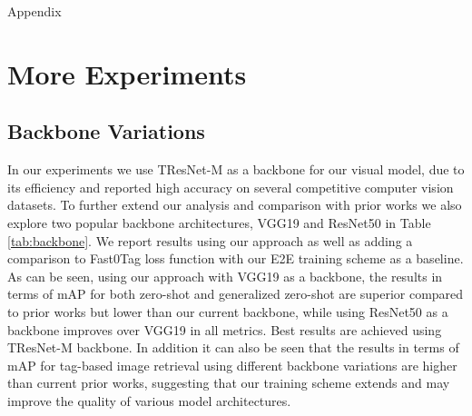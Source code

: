 
\begin{center} \begin{Large}{Appendix} \end{Large} \end{center}
\label{appendix}

\section{More Experiments}
\label{sec:more_experiments}
\subsection{Backbone Variations}

In our experiments we use TResNet-M \cite{ridnik2021tresnet} as a backbone for our visual model, due to its efficiency and reported high accuracy on several competitive computer vision datasets. To further extend our analysis and comparison with prior works we also explore two popular backbone architectures, VGG19 \cite{simonyan2014very} and ResNet50 \cite{he2016deep} in Table \ref{tab:backbone}. We report results using our approach as well as adding a comparison to Fast0Tag \cite{zhang2016fast} loss function with our E2E training scheme as a baseline. As can be seen, using our approach with VGG19 as a backbone, the results in terms of mAP for both zero-shot and generalized zero-shot are superior compared to prior works but lower than our current backbone, while using ResNet50 as a backbone improves over VGG19 in all metrics. Best results are achieved using TResNet-M backbone. In addition it can also be seen that the results in terms of mAP for tag-based image retrieval using different backbone variations are higher than current prior works, suggesting that our training scheme extends and may improve the quality of various model architectures. 

